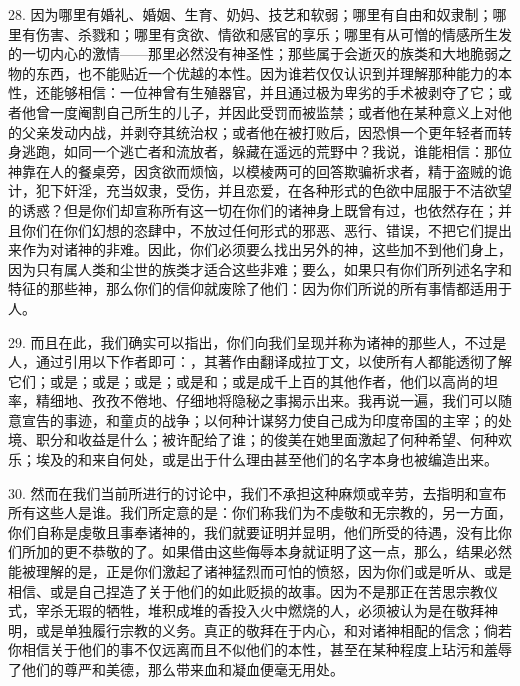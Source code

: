 28. 因为哪里有婚礼、婚姻、生育、奶妈、技艺和软弱；哪里有自由和奴隶制；哪里有伤害、杀戮和；哪里有贪欲、情欲和感官的享乐；哪里有从可憎的情感所生发的一切内心的激情——那里必然没有神圣性；那些属于会逝灭的族类和大地脆弱之物的东西，也不能贴近一个优越的本性。因为谁若仅仅认识到并理解那种能力的本性，还能够相信：一位神曾有生殖器官，并且通过极为卑劣的手术被剥夺了它；或者他曾一度阉割自己所生的儿子，并因此受罚而被监禁；或者他在某种意义上对他的父亲发动内战，并剥夺其统治权；或者他在被打败后，因恐惧一个更年轻者而转身逃跑，如同一个逃亡者和流放者，躲藏在遥远的荒野中？我说，谁能相信：那位神靠在人的餐桌旁，因贪欲而烦恼，以模棱两可的回答欺骗祈求者，精于盗贼的诡计，犯下奸淫，充当奴隶，受伤，并且恋爱，在各种形式的色欲中屈服于不洁欲望的诱惑？但是你们却宣称所有这一切在你们的诸神身上既曾有过，也依然存在；并且你们在你们幻想的恣肆中，不放过任何形式的邪恶、恶行、错误，不把它们提出来作为对诸神的非难。因此，你们必须要么找出另外的神，这些加不到他们身上，因为只有属人类和尘世的族类才适合这些非难；要么，如果只有你们所列述名字和特征的那些神，那么你们的信仰就废除了他们：因为你们所说的所有事情都适用于人。\par

29. 而且在此，我们确实可以指出，你们向我们呈现并称为诸神的那些人，不过是人，通过引用以下作者即可：，其著作由翻译成拉丁文，以使所有人都能透彻了解它们；或是；或是；或是；或是和；或是成千上百的其他作者，他们以高尚的坦率，精细地、孜孜不倦地、仔细地将隐秘之事揭示出来。我再说一遍，我们可以随意宣告的事迹，和童贞的战争；以何种计谋努力使自己成为印度帝国的主宰；的处境、职分和收益是什么；被许配给了谁；的俊美在她里面激起了何种希望、何种欢乐；埃及的和来自何处，或是出于什么理由甚至他们的名字本身也被编造出来。\par

30. 然而在我们当前所进行的讨论中，我们不承担这种麻烦或辛劳，去指明和宣布所有这些人是谁。我们所定意的是：你们称我们为不虔敬和无宗教的，另一方面，你们自称是虔敬且事奉诸神的，我们就要证明并显明，他们所受的待遇，没有比你们所加的更不恭敬的了。如果借由这些侮辱本身就证明了这一点，那么，结果必然能被理解的是，正是你们激起了诸神猛烈而可怕的愤怒，因为你们或是听从、或是相信、或是自己捏造了关于他们的如此贬损的故事。因为不是那正在苦思宗教仪式，宰杀无瑕的牺牲，堆积成堆的香投入火中燃烧的人，必须被认为是在敬拜神明，或是单独履行宗教的义务。真正的敬拜在于内心，和对诸神相配的信念；倘若你相信关于他们的事不仅远离而且不似他们的本性，甚至在某种程度上玷污和羞辱了他们的尊严和美德，那么带来血和凝血便毫无用处。\par

